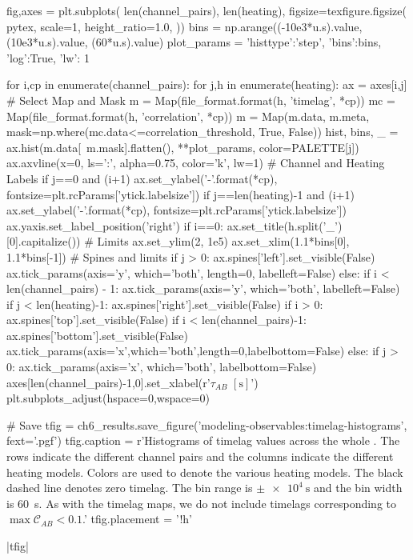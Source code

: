 \begin{pycode}
fig,axes = plt.subplots(
    len(channel_pairs), len(heating),
    figsize=texfigure.figsize(
        pytex,
        scale=1,
        height_ratio=1.0,
))
bins = np.arange((-10e3*u.s).value, (10e3*u.s).value, (60*u.s).value)
plot_params = { 'histtype':'step', 'bins':bins, 'log':True, 'lw': 1}

for i,cp in enumerate(channel_pairs):
    for j,h in enumerate(heating):
        ax = axes[i,j]
        # Select Map and Mask
        m = Map(file_format.format(h, 'timelag', *cp))
        mc = Map(file_format.format(h, 'correlation', *cp))
        m = Map(m.data, m.meta, mask=np.where(mc.data<=correlation_threshold, True, False))
        hist, bins, _ = ax.hist(m.data[~m.mask].flatten(), **plot_params, color=PALETTE[j])
        ax.axvline(x=0, ls=':', alpha=0.75, color='k', lw=1)
        # Channel and Heating Labels
        if j==0 and (i+1)%
            ax.set_ylabel('{}-{}'.format(*cp), fontsize=plt.rcParams['ytick.labelsize'])
        if j==len(heating)-1 and (i+1)%
            ax.set_ylabel('{}-{}'.format(*cp), fontsize=plt.rcParams['ytick.labelsize'])
            ax.yaxis.set_label_position('right')
        if i==0:
            ax.set_title(h.split('_')[0].capitalize())
        # Limits
        ax.set_ylim(2, 1e5)
        ax.set_xlim(1.1*bins[0], 1.1*bins[-1])
        # Spines and limits
        if j > 0:
            ax.spines['left'].set_visible(False)
            ax.tick_params(axis='y', which='both', length=0, labelleft=False)
        else:
            if i < len(channel_pairs) - 1:
                ax.tick_params(axis='y', which='both', labelleft=False)
        if j < len(heating)-1:
            ax.spines['right'].set_visible(False)
        if i > 0:
            ax.spines['top'].set_visible(False)
        if i < len(channel_pairs)-1:
            ax.spines['bottom'].set_visible(False)
            ax.tick_params(axis='x',which='both',length=0,labelbottom=False)
        else:
            if j > 0:
                ax.tick_params(axis='x', which='both', labelbottom=False)
axes[len(channel_pairs)-1,0].set_xlabel(r'$\tau_{AB}$ $[\si{\second}]$')
plt.subplots_adjust(hspace=0,wspace=0)

# Save
tfig = ch6_results.save_figure('modeling-observables:timelag-histograms', fext='.pgf')
tfig.caption = r'Histograms of timelag values across the whole \AR{}. The rows indicate the different channel pairs and the columns indicate the different heating models. Colors are used to denote the various heating models. The black dashed line denotes zero timelag. The bin range is $\pm\SI{e4}{\second}$ and the bin width is \SI{60}{\second}. As with the timelag maps, we do not include timelags corresponding to $\max{\mathcal{C}_{AB}}<0.1$.'
tfig.placement = '!h'
\end{pycode}
|tfig|

